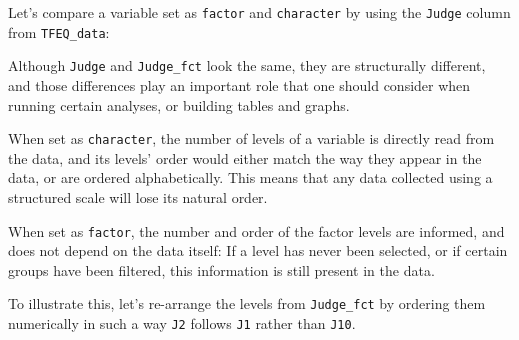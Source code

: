 \documentclass[
]{book}
\newenvironment{Shaded}{\begin{snugshade}}{\end{snugshade}}
\newcommand{\AttributeTok}[1]{\textcolor[rgb]{0.77,0.63,0.00}{#1}}
\newcommand{\ConstantTok}[1]{\textcolor[rgb]{0.00,0.00,0.00}{#1}}
\newcommand{\FunctionTok}[1]{\textcolor[rgb]{0.00,0.00,0.00}{#1}}
\newcommand{\NormalTok}[1]{#1}
\newcommand{\OtherTok}[1]{\textcolor[rgb]{0.56,0.35,0.01}{#1}}
\newcommand{\SpecialCharTok}[1]{\textcolor[rgb]{0.00,0.00,0.00}{#1}}
\begin{document}
Let's compare a variable set as \texttt{factor} and \texttt{character} by using the \texttt{Judge} column from \texttt{TFEQ\_data}:

\begin{Shaded}
\end{Shaded}

Although \texttt{Judge} and \texttt{Judge\_fct} look the same, they are structurally different, and those differences play an important role that one should consider when running certain analyses, or building tables and graphs.

When set as \texttt{character}, the number of levels of a variable is directly read from the data, and its levels' order would either match the way they appear in the data, or are ordered alphabetically. This means that any data collected using a structured scale will lose its natural order.

When set as \texttt{factor}, the number and order of the factor levels are informed, and does not depend on the data itself: If a level has never been selected, or if certain groups have been filtered, this information is still present in the data.

To illustrate this, let's re-arrange the levels from \texttt{Judge\_fct} by ordering them numerically in such a way \texttt{J2} follows \texttt{J1} rather than \texttt{J10}.

\begin{Shaded}
\end{Shaded}
\end{document}
